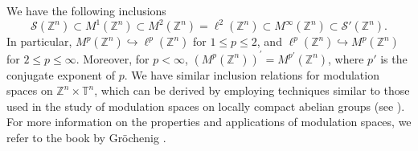 \documentclass[a4paper,11pt, reqno]{amsart}
\theoremstyle{plain}
\theoremstyle{definition}
\theoremstyle{remark}
\def \Z{{\mathbb Z}}
\def \T{{\mathbb T}}
\begin{document}
We have the following inclusions
\[ \mathcal{S}(\Z^n) \subset M^1(\Z^n) \subset M^2(\Z^n)=\ell^2(\Z^n) \subset M^\infty(\Z^n) \subset \mathcal{S'}(\Z^n).\]
In particular, $M^p(\Z^n) \hookrightarrow \ell^p(\Z^n)$ for $1 \leq p \leq 2$, and  $\ell^p(\Z^n) \hookrightarrow M^p(\Z^n)$ for $2 \leq p \leq \infty$. Moreover, for $p < \infty$, $(M^{p}(\Z^n))^{'} =M^{p'}(\Z^n)$, where $p'$ is the conjugate exponent of $p$. 
We have similar inclusion relations for modulation spaces on $\Z^n \times \T^n$, which can be derived by employing techniques similar to those used in the study of modulation spaces on locally compact abelian groups (see \cite{bas22, fei03}). For more information on the properties and applications of modulation spaces, we refer to the book by Gr\"ochenig \cite{gro01}.
\end{document}
